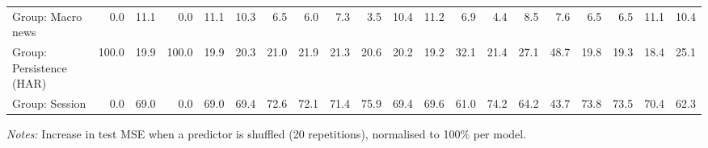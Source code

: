 \begin{table}[htbp]
{\begin{tabular}{lrrrrrrrrrrrrrrrrrrr}
Group: Macro news & 0.0 & 11.1 & 0.0 & 11.1 & 10.3 & 6.5 & 6.0 & 7.3 & 3.5 & 10.4 & 11.2 & 6.9 & 4.4 & 8.5 & 7.6 & 6.5 & 6.5 & 11.1 & 10.4 \\
Group: Persistence (HAR) & 100.0 & 19.9 & 100.0 & 19.9 & 20.3 & 21.0 & 21.9 & 21.3 & 20.6 & 20.2 & 19.2 & 32.1 & 21.4 & 27.1 & 48.7 & 19.8 & 19.3 & 18.4 & 25.1 \\
Group: Session & 0.0 & 69.0 & 0.0 & 69.0 & 69.4 & 72.6 & 72.1 & 71.4 & 75.9 & 69.4 & 69.6 & 61.0 & 74.2 & 64.2 & 43.7 & 73.8 & 73.5 & 70.4 & 62.3 \\
\bottomrule
\end{tabular}%
}
\par\vspace{2pt}\footnotesize\textit{Notes:} Increase in test MSE when a predictor is shuffled (20 repetitions), normalised to 100\% per model.
\end{table}
